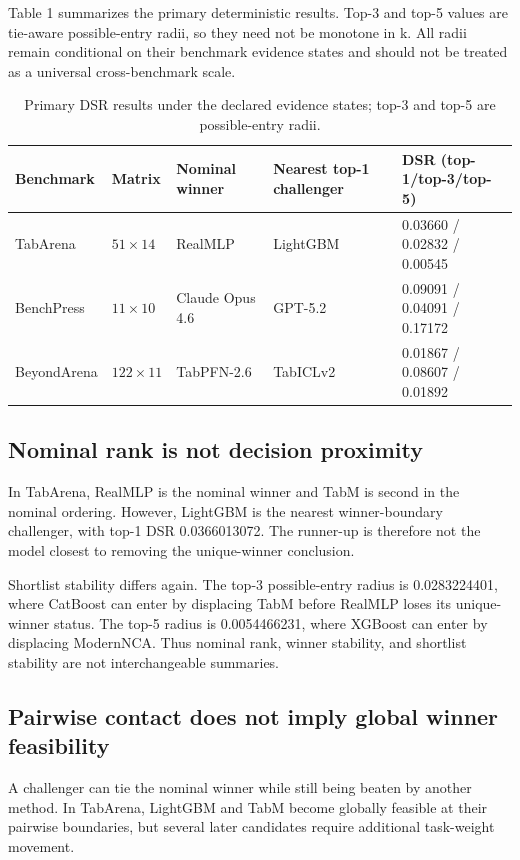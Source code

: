 \documentclass[11pt]{article}
\begin{document}
Table 1 summarizes the primary deterministic results. Top-3 and top-5 values are tie-aware possible-entry radii, so they need not be monotone in k. All radii remain conditional on their benchmark evidence states and should not be treated as a universal cross-benchmark scale.

\begin{table}[htbp]
\centering
\caption{Primary DSR results under the declared evidence states; top-3 and top-5 are possible-entry radii.}
\label{tab:primary}
\small
\begin{tabular}{lllll}
\toprule
Benchmark & Matrix & Nominal winner & Nearest top-1 challenger & DSR (top-1/top-3/top-5)\\
\midrule
TabArena & $51\times14$ & RealMLP & LightGBM & 0.03660 / 0.02832 / 0.00545\\
BenchPress & $11\times10$ & Claude Opus 4.6 & GPT-5.2 & 0.09091 / 0.04091 / 0.17172\\
BeyondArena & $122\times11$ & TabPFN-2.6 & TabICLv2 & 0.01867 / 0.08607 / 0.01892\\
\bottomrule
\end{tabular}
\end{table}

\subsection{Nominal rank is not decision proximity}

In TabArena, RealMLP is the nominal winner and TabM is second in the nominal ordering. However, LightGBM is the nearest winner-boundary challenger, with top-1 DSR 0.0366013072. The runner-up is therefore not the model closest to removing the unique-winner conclusion.

Shortlist stability differs again. The top-3 possible-entry radius is 0.0283224401, where CatBoost can enter by displacing TabM before RealMLP loses its unique-winner status. The top-5 radius is 0.0054466231, where XGBoost can enter by displacing ModernNCA. Thus nominal rank, winner stability, and shortlist stability are not interchangeable summaries.

\subsection{Pairwise contact does not imply global winner feasibility}

A challenger can tie the nominal winner while still being beaten by another method. In TabArena, LightGBM and TabM become globally feasible at their pairwise boundaries, but several later candidates require additional task-weight movement.
\end{document}
